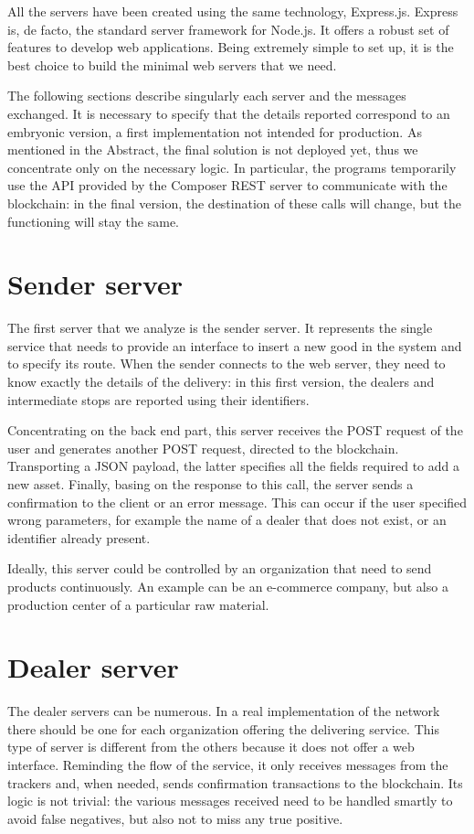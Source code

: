 All the servers have been created using the same technology, Express.js. Express is, de facto, the standard server framework for Node.js. It offers a robust set of features to develop web applications. Being extremely simple to set up, it is the best choice to build the minimal web servers that we need.

The following sections describe singularly each server and the messages exchanged. It is necessary to specify that the details reported correspond to an embryonic version, a first implementation not intended for production. As mentioned in the Abstract, the final solution is not deployed yet, thus we concentrate only on the necessary logic. In particular, the programs temporarily use the API provided by the Composer REST server to communicate with the blockchain: in the final version, the destination of these calls will change, but the functioning will stay the same.

\section{Sender server}
The first server that we analyze is the sender server. It represents the single service that needs to provide an interface to insert a new good in the system and to specify its route. When the sender connects to the web server, they need to know exactly the details of the delivery: in this first version, the dealers and intermediate stops are reported using their identifiers.

Concentrating on the back end part, this server receives the POST request of the user and generates another POST request, directed to the blockchain. Transporting a JSON payload, the latter specifies all the fields required to add a new asset. Finally, basing on the response to this call, the server sends a confirmation to the client or an error message. This can occur if the user specified wrong parameters, for example the name of a dealer that does not exist, or an identifier already present. 

Ideally, this server could be controlled by an organization that need to send products continuously. An example can be an e-commerce company, but also a production center of a particular raw material.

\section{Dealer server}
The dealer servers can be numerous. In a real implementation of the network there should be one for each organization offering the delivering service. This type of server is different from the others because it does not offer a web interface. Reminding the flow of the service, it only receives messages from the trackers and, when needed, sends confirmation transactions to the blockchain. Its logic is not trivial: the various messages received need to be handled smartly to avoid false negatives, but also not to miss any true positive.

